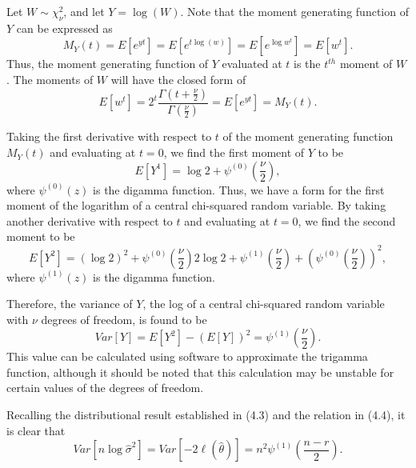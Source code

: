 \documentclass[12pt]{article} %
\theoremstyle{definition}
\begin{document}
Let $W \sim \chi^2_{\nu}$, and let $Y = \log(W)$. Note that the moment generating function of $Y$ can be expressed as
\begin{equation*}
	M_Y (t) = E \left[ e^{yt} \right] = E \left[ e^{t\log(w)} \right] = E \left[ e^{\log w^t} \right] = E \left[ w^t \right] .
\end{equation*}
Thus, the moment generating function of $Y$ evaluated at $t$ is the $t^{th}$ moment of $W$. The moments of $W$ will have the
closed form of
\begin{equation*}
	E \left[ w^t \right] = 2^t \frac{\Gamma (t + \frac{\nu}{2})}{\Gamma (\frac{\nu}{2})} = E \left[ e^{yt} \right] = M_Y (t) .
\end{equation*}

Taking the first derivative with respect to $t$ of the moment generating function $M_Y (t)$ and evaluating at $t=0$, we find the first moment of $Y$ to be
\begin{equation*}
	E \left[ Y^1 \right] =  \log 2 + \psi^{(0)} \left( \frac{\nu}{2} \right) ,
\end{equation*}
where $\psi^{(0)}(z)$ is the digamma function. Thus, we have a form for the first moment of the logarithm of a central chi-squared random variable. By taking another
derivative with respect to $t$ and evaluating at $t=0$, we find the second moment to be
\begin{equation*}
	E \left[ Y^2 \right] =
	(\log 2)^2 + \psi^{(0)} \left( \frac{\nu}{2} \right) 2 \log 2  + \psi^{(1)} \left( \frac{\nu}{2} \right) + \left( \psi^{(0)} \left( \frac{\nu}{2} \right) \right)^2 ,
\end{equation*}
where $\psi^{(1)}(z)$ is the digamma function.

Therefore, the variance of $Y$, the log of a central chi-squared random variable with
$\nu$ degrees of freedom, is found to be
\begin{equation*}
	Var \left[ Y \right] = E \left[ Y^2 \right] - \left( E \left[ Y \right] \right)^2 = \psi^{(1)} \left( \frac{\nu}{2} \right) .
\end{equation*}
This value can be calculated using software to approximate the trigamma function, although it should be noted that this calculation may be unstable for certain values of the degrees of freedom.

Recalling the distributional result established in (4.3) and the relation in (4.4), it is clear that
\begin{equation*}
	Var \left[ n \log \hat{\sigma}^2 \right] = Var \left[ -2 \ell (\hat{\theta} ) \right] = n^2 \psi^{(1)} \left( \frac{n-r}{2} \right).
\end{equation*}
\end{document}
